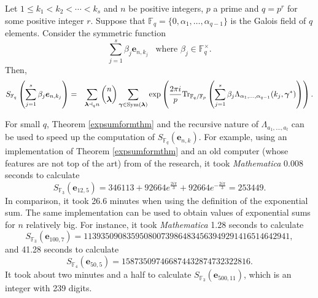 \begin{corollary}
\label{coropart}
Let $1\leq k_1<k_2<\cdots<k_s$ and $n$ be positive integers, $p$ a prime and $q=p^r$ for some positive integer $r$. Suppose that $\mathbb{F}_q=\{0,\alpha_1,\ldots, \alpha_{q-1}\}$ is the Galois field of $q$ elements. 
Consider the symmetric function
$$\sum_{j=1}^s \beta_j \boldsymbol{e}_{n,k_j}\,\,\, \text{ where }\beta_j\in \mathbb{F}_q^{\times}.$$
Then,
\begin{eqnarray*}
S_{\mathbb{F}_q}\left(\sum_{j=1}^s \beta_j\boldsymbol{e}_{n,k_j}\right)&=&\sum_{\boldsymbol{\lambda}\dashv_q n} \binom{n}{\boldsymbol{\lambda}} \sum_{\boldsymbol{\gamma}\in \mathrm{Sym}(\boldsymbol{\lambda})}
 \exp\left(\frac{2\pi i}{p} \text{Tr}_{\mathbb{F}_q/\mathbb{F}_p}\left(\sum_{j=1}^s \beta_j\Lambda_{\alpha_1,\ldots, \alpha_{q-1}}(k_j,\boldsymbol{\gamma}^*)\right)\right).
\end{eqnarray*}
\end{corollary}

For small $q$, Theorem \ref{expsumformthm} and the recursive nature of $\Lambda_{a_1,\ldots,a_l}$ can be used to speed up the computation of $S_{\mathbb{F}_q}(\boldsymbol{e}_{n,k})$.  For example,
using an implementation of Theorem \ref{expsumformthm} and an old computer (whose features are not top of the art) from of the research, it took {\it Mathematica} 0.008 seconds to calculate
\begin{equation}
 S_{\mathbb{F}_3}(\boldsymbol{e}_{12,5}) = 346113+92664 e^{\frac{2 i \pi }{3}}+92664 e^{-\frac{2 i \pi }{3}} = 253449.
\end{equation}
In comparison, it took 26.6 minutes when using the definition of the exponential sum.  The same implementation can be used to obtain values of exponential sums for $n$ relatively big.  
For instance, it took {\it Mathematica} 1.28 seconds to calculate
\begin{equation}
 S_{\mathbb{F}_3}(\boldsymbol{e}_{100,7}) = 113935090835950800739864834563949291416514642941,
\end{equation}
and 41.28 seconds to calculate 
\begin{equation}
 S_{\mathbb{F}_4}(\boldsymbol{e}_{50,5}) = 158735097466874432874732322816.
\end{equation}
It took about two minutes and a half to calculate $S_{\mathbb{F}_3}(\boldsymbol{e}_{500,11})$, which is an integer with 239 digits.

